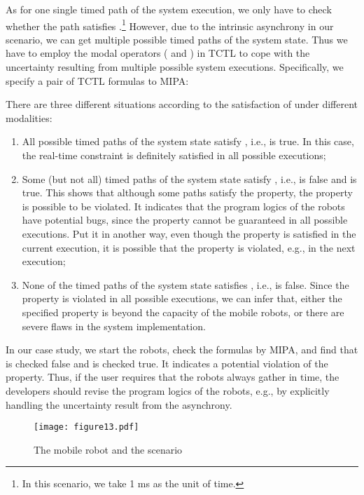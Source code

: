 \documentclass[10pt,conference,compsocconf,letterpaper]{IEEEtran}
\begin{document}
As for one single timed path of the system execution, we only have to check whether the path satisfies .\footnote{In this scenario, we take 1 ms as the unit of time.} However, due to the intrinsic asynchrony in our scenario, we can get multiple possible timed paths of the system state. Thus we have to employ the modal operators ( and ) in TCTL to cope with the uncertainty resulting from multiple possible system executions. Specifically, we specify a pair of TCTL formulas to MIPA:

There are three different situations according to the satisfaction of  under different modalities:
\begin{enumerate}\setlength{\itemsep}{0pt}
    \item All possible timed paths of the system state satisfy , i.e.,  is true. In this case, the real-time constraint is definitely satisfied in all possible executions;
    \item Some (but not all) timed paths of the system state satisfy , i.e.,  is false and  is true. This shows that although some paths satisfy the property, the property is possible to be violated. It indicates that the program logics of the robots have potential bugs, since the property cannot be guaranteed in all possible executions. Put it in another way, even though the property is satisfied in the current execution, it is possible that the property is violated, e.g., in the next execution;
    \item  None of the timed paths of the system state satisfies , i.e.,  is false. Since the property is violated in all possible executions, we can infer that, either the specified property is beyond the capacity of the mobile robots, or there are severe flaws in the system implementation.
\end{enumerate}


In our case study, we start the robots, check the formulas by MIPA, and find that  is checked false and  is checked true. It indicates a potential violation of the property. Thus, if the user requires that the robots always gather in time, the developers should revise the program logics of the robots, e.g., by explicitly handling the uncertainty result from the asynchrony.

\begin{figure}[tbp]
\begin{center}
  \texttt{[image: figure13.pdf]}
  \caption{The mobile robot and the scenario}
  \label{F:case study}
\end{center}
\end{figure}
\end{document}
